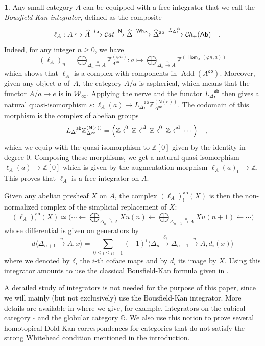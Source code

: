 \documentclass[10pt, english, a4paper, nothms]{amsart}
\theoremstyle{plain}
\theoremstyle{remark}
\theoremstyle{definition}
\newtheorem{paragr}[theorem]{}
\numberwithin{equation}{theorem}
\renewcommand\leq\leqslant
\renewcommand\geq\geqslant
\newcommand\Z{\mathbb{Z}}
\newcommand\G{\mathbb{G}}
\newcommand{\Cat}{{\mathcal{C}\mspace{-2.mu}\it{at}}}
\newcommand{\Ch}{{\mathcal{C}\mspace{-2.mu}\it{h}_{+}}}
\newcommand{\Hom}{\operatorname{\mathsf{Hom}}}
\newcommand{\id}{\mathrm{id}}
\DeclareMathOperator{\op}{\mathsf{op}}
\newcommand{\pref}[1]{{\widehat{ #1 }}}
\newcommand{\tranche}[2]{#1/{#2}}
\newcommand{\W}{\mathcal{W}}
\newcommand{\Ab}{{\mathsf{Ab}}}
\newcommand{\ab}{{\mathsf{ab}}}
\DeclareMathOperator{\Add}{\mathrm{Add}}
\newcommand{\Wh}[2]{\Z_{#1}^{\left(#2\right)}}
\newcommand{\Whf}[1]{\operatorname{\mathsf{Wh}_{#1}}}
\newcommand{\prefab}[1]{\widehat{ #1 }^{\mathsf{ab}}}
\newcommand{\cub}{\square}
\newcommand{\nerf}{\mathsf{N}}
\let\epsilon\varepsilon
\newcommand\zbox[1]{\makebox[0pt][l]{#1}}
\newcommand\pbox[1]{\zbox{\quad #1}} %
\begin{document}
\begin{paragr}\label{paragr:BousfieldKanIntegrator}
Any small category $A$ can be equipped with a free integrator that we
call the \emph{Bousfield-Kan integrator}, defined as the composite
\[
\ell_A: A \hookrightarrow \pref{A} \xrightarrow{i_A} \Cat
\xrightarrow{\nerf} \pref{\Delta} \xrightarrow{\Whf{\Delta}} 
\prefab{\Delta} \xrightarrow{{L_{\Delta}}_!^\ab} \Ch(\Ab) \pbox{.}
\]
Indeed, for any integer $n\geq 0$, we have
  \[
{(\ell_A)}_n = \bigoplus_{\Delta_n
\xrightarrow{u}A}\Wh{{A}^{\op}}{\varphi n}: a \mapsto
\bigoplus_{\Delta_n \xrightarrow{u}A} \Z^{(\Hom_A(\varphi n,a))}
  \]
which shows that $\ell_A$ is a complex with components in
$\Add({A}^{\op})$. 
Moreover, given any object $a$ of~$A$, the category $\tranche{A}{a}$ is
aspherical, which means that the functor $\tranche{A}{a}\to e$ is in
$\W_\infty$. Applying the nerve and the functor ${L_\Delta}_!^\ab$ then gives a
natural quasi-isomorphism $\epsilon : \ell_A(a) \to
{L_\Delta}_!^\ab\Wh{{\Delta}^{\op}}{\nerf(e)}$. The codomain of this morphism is
the complex of abelian groups 
\[
{L_\Delta}_!^\ab\Wh{{\Delta}^{\op}}{\nerf(e)} =
\left(
\Z \xleftarrow{0} \Z \xleftarrow{\id} \Z \xleftarrow{0} \Z \xleftarrow{\id}
\cdots
\right) \pbox{,}
\]
which we equip with the quasi-isomorphism to $\Z[0]$ given by the
identity in degree $0$. Composing these morphisms, we get a natural
quasi-isomorphism $\ell_A(a) \to \Z[0]$ which is given by the augmentation
morphism $\ell_A(a)_0 \to \Z$.
This proves that $\ell_A$ is a free integrator on $A$.

Given any abelian presheaf $X$ on $A$, the complex $(\ell_A)^\ab_!(X)$ is
then the non-normalized complex of the simplicial replacement
\cite{bousfield1972homotopy} of $X$:
\[
(\ell_A)^\ab_!(X) \simeq 
\Big(
\cdots \leftarrow
\bigoplus_{\Delta_n \xrightarrow{u} A} Xu(n) 
\leftarrow
\bigoplus_{\Delta_{n+1} \xrightarrow{u} A} Xu(n+1) 
\leftarrow \cdots
\Big)
\]
whose differential is given on generators by 
\[
  d \langle \Delta_{n+1} \xrightarrow{u} A, x\rangle = 
  \sum_{0 \leq i \leq n+1} (-1)^i \langle \Delta_{n}
  \xrightarrow{\delta_i} \Delta_{n+1} \xrightarrow{u} A, d_i(x) \rangle
\]
where we denoted by $\delta_i$ the $i$-th coface maps and by $d_i$ its image
by $X$. Using this integrator amounts to use the classical
Bousfield-Kan formula given in \cite[XII, 5.5]{bousfield1972homotopy}.
\end{paragr}


A detailed study of integrators is not needed for the purpose of this
paper, since we will mainly (but not exclusively) use the Bousfield-Kan
integrator. More details are available in \cite{hubert2025phd} where we give,
for example, integrators on the cubical category $\cub$ and the globular category
$\G$. We also use this notion to prove several homotopical Dold-Kan
correspondences for categories that do not satisfy the strong Whitehead
condition mentioned in the introduction.
\end{document}
